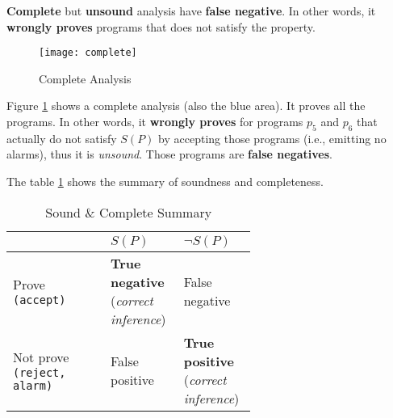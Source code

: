 \textbf{Complete} but \textbf{unsound} analysis have \textbf{false
  negative}. In other words, it \textbf{wrongly proves} programs that
does not satisfy the property.


\begin{figure}[h]
  \texttt{[image: complete]}
  \caption{Complete Analysis}
  \label{fig:complete}
\end{figure}

Figure \ref{fig:complete} shows a complete analysis (also the blue
area). It proves all the programs. In other words, it \textbf{wrongly
  proves} for programs $ p_5 $ and $ p_6 $ that actually do not
satisfy $ S(P) $ by accepting those programs (i.e., emitting no
alarms), thus it is \textit{unsound}. Those programs are \textbf{false
  negatives}.


The table \ref{tab:summary} shows the summary of soundness and
completeness.

\begin{table}[ht]
  \centering
  \caption{Sound \& Complete Summary}
  \label{tab:summary}

  \begin{tabular}[t]{l>{\raggedright}p{0.3\linewidth}>{\raggedright\arraybackslash}p{0.3\linewidth}}
    \hline
    & $ S(P) $ & $ \neg S(P) $ \\
    \hline
    Prove \texttt{(accept)} & \textbf{True negative} (\textsl{correct inference}) & False negative \\
    Not prove \texttt{(reject, alarm)} & False positive & \textbf{True positive} (\textsl{correct inference}) \\
    \hline
  \end{tabular}
\end{table}%


